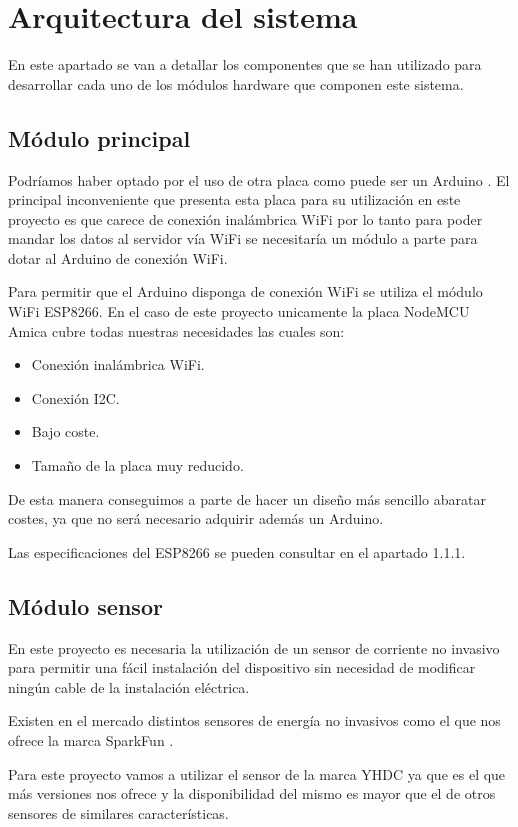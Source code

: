 \section{Arquitectura del sistema}

En este apartado se van a detallar los componentes que se han utilizado para desarrollar cada uno de los módulos hardware que componen este sistema.

\subsection{Módulo principal}
Podríamos haber optado por el uso de otra placa como puede ser un Arduino \cite{arduino}. El principal inconveniente que presenta esta placa para su utilización en este proyecto es que carece de conexión inalámbrica WiFi por lo tanto para poder mandar los datos al servidor vía WiFi se necesitaría un módulo a parte para dotar al Arduino de conexión WiFi.

Para permitir que el Arduino disponga de conexión WiFi se utiliza el módulo WiFi ESP8266. En el caso de este proyecto unicamente la placa NodeMCU Amica cubre todas nuestras necesidades las cuales son:

\begin{itemize}
	\item Conexión inalámbrica WiFi.
	\item Conexión I2C.
	\item Bajo coste.
	\item Tamaño de la placa muy reducido.
\end{itemize}

De esta manera conseguimos a parte de hacer un diseño más sencillo abaratar costes, ya que no será necesario adquirir además un Arduino.

Las especificaciones del ESP8266 se pueden consultar en el apartado 1.1.1.

\subsection{Módulo sensor}
En este proyecto es necesaria la utilización de un sensor de corriente no invasivo para permitir una fácil instalación del dispositivo sin necesidad de modificar ningún cable de la instalación eléctrica.

Existen en el mercado distintos sensores de energía no invasivos como el que nos ofrece la marca SparkFun \cite{sparkfun}.

Para este proyecto vamos a utilizar el sensor de la marca YHDC ya que es el que más versiones nos ofrece y la disponibilidad del mismo es mayor que el de otros sensores de similares características.

